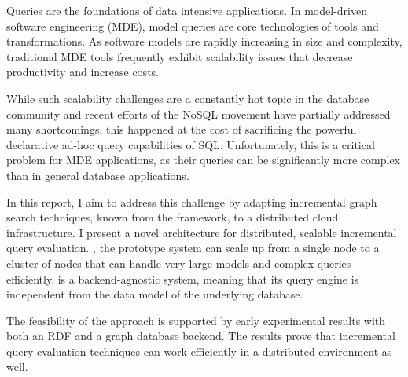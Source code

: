 Queries are the foundations of data intensive applications. In model-driven software engineering (MDE), model queries are core technologies of tools and transformations. As software models are rapidly increasing in size and complexity, traditional MDE tools frequently exhibit scalability issues that decrease productivity and increase costs.

While such scalability challenges are a constantly hot topic in the database community and recent efforts of the NoSQL movement have partially addressed many shortcomings, this happened at the cost of sacrificing the powerful declarative ad-hoc query capabilities of SQL. Unfortunately, this is a critical problem for MDE applications, as their queries can be significantly more complex than in general database applications.

In this report, I aim to address this challenge by adapting incremental graph search techniques, known from the \eiq{} framework, to a distributed cloud infrastructure. I present a novel architecture for distributed, scalable incremental query evaluation. \iqd{}, the prototype system can scale up from a single node to a cluster of nodes that can handle very large models and complex queries efficiently. \iqd{} is a backend-agnostic system, meaning that its query engine is independent from the data model of the underlying database.

The feasibility of the approach is supported by early experimental results with both an RDF and a graph database backend. The results prove that incremental query evaluation techniques can work efficiently in a distributed environment as well.
 
\vfill
